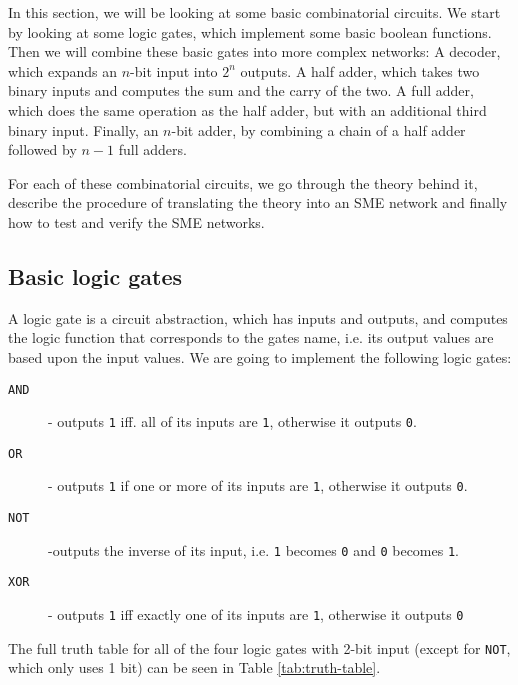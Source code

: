 In this section, we will be looking at some basic combinatorial circuits. We
start by looking at some logic gates, which implement some basic boolean
functions. Then we will combine these basic gates into more complex networks: A
decoder, which expands an $n$-bit input into $2^n$ outputs. A half adder, which
takes two binary inputs and computes the sum and the carry of the two. A full
adder, which does the same operation as the half adder, but with an additional
third binary input. Finally, an $n$-bit adder, by combining a chain of a half
adder followed by $n-1$ full adders.

For each of these combinatorial circuits, we go through the theory behind it,
describe the procedure of translating the theory into an SME network and
finally how to test and verify the SME networks.

\subsection{Basic logic gates}
A logic gate is a circuit abstraction, which has inputs and outputs, and
computes the logic function that corresponds to the gates name, i.e. its output
values are based upon the input values. We are going to implement the following
logic gates:

\begin{description}
    \item[\texttt{AND}] - outputs \texttt{1} iff. all of its inputs are
        \texttt{1}, otherwise it outputs \texttt{0}.

    \item[\texttt{OR}] - outputs \texttt{1} if one or more of its inputs are
        \texttt{1}, otherwise it outputs \texttt{0}.

    \item[\texttt{NOT}] -outputs the inverse of its input, i.e. \texttt{1}
        becomes \texttt{0} and \texttt{0} becomes \texttt{1}.

    \item[\texttt{XOR}] - outputs \texttt{1} iff exactly one of its inputs are
        \texttt{1}, otherwise it outputs \texttt{0}
\end{description}
The full truth table for all of the four logic gates with 2-bit input (except
for \texttt{NOT}, which only uses 1 bit) can be seen in Table
\ref{tab:truth-table}.

